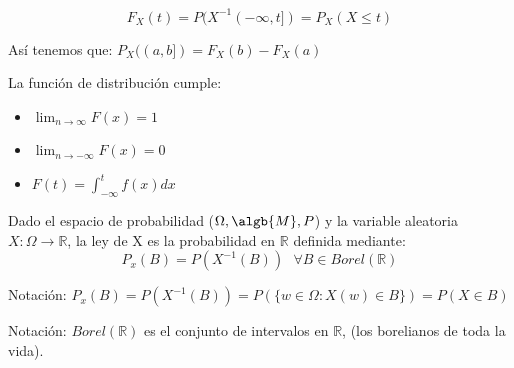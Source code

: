 \documentclass{apuntes}
\begin{document}
\begin{defn}
\[
F_X(t)=P(X^{-1}(-\infty,t])=P_X(X \leq t)
\]

Así tenemos que: $P_X((a,b])=F_X(b)-F_X(a)$

La función de distribución cumple:
\begin{itemize}
\item $\lim_{n \rightarrow \infty}F(x)=1$
\item $\lim_{n \rightarrow -\infty}F(x)=0$
\item $F(t)=\int_{-\infty}^{t}f(x)dx$
\end{itemize}

\end{defn}

\begin{defn}[ley de X]
Dado el espacio de probabilidad ($\Omega, \algb{M}, P$) y la variable aleatoria $X: \Omega \rightarrow \mathbb{R}$, la ley de X es la probabilidad en $\mathbb{R}$ definida mediante:
\[
P_x(B)=P(X^{-1}(B)) \text{ } \forall B \in Borel(\mathbb{R})
\]

Notación: $P_x(B) = P(X^{-1}(B)) = P(\{w \in \Omega : X(w) \in B\})=P(X \in B)$

Notación: $Borel(\mathbb{R})$ es el conjunto de intervalos en $\mathbb{R}$, (los borelianos de toda la vida).


\end{defn}
\end{document}
